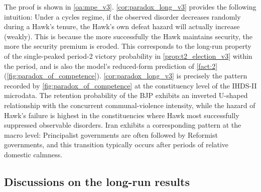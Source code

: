 \documentclass[11pt,twoside]{extarticle}
\begin{document}
The proof is shown in \autoref{oa:mpe_v3}. \autoref{cor:paradox_long_v3} provides the following intuition: Under a cycles regime, if the observed disorder decreases randomly during a Hawk's tenure, the Hawk's own defeat hazard will actually increase (weakly). This is because the more successfully the Hawk maintains security, the more the security premium is eroded.
This corresponds to the long-run property of the single-peaked period-2 victory probability in \autoref{prop:t2_election_v3} within the period, and is also the model's reduced-form prediction of \autoref{fact:2}(\autoref{fig:paradox_of_competence}).
\autoref{cor:paradox_long_v3} is precisely the pattern recorded by \autoref{fig:paradox_of_competence} at the constituency level of the IHDS-II microdata. The retention probability of the BJP exhibits an inverted U-shaped relationship with the concurrent communal-violence intensity, while the hazard of Hawk's failure is highest in the constituencies where Hawk most successfully suppressed observable disorders.
Iran exhibits a corresponding pattern at the macro level: Principalist governments are often followed by Reformist governments, and this transition typically occurs after periods of relative domestic calmness.

\subsection{Discussions on the long-run results}\label{subsec:scope_long_v3}

\end{document}
